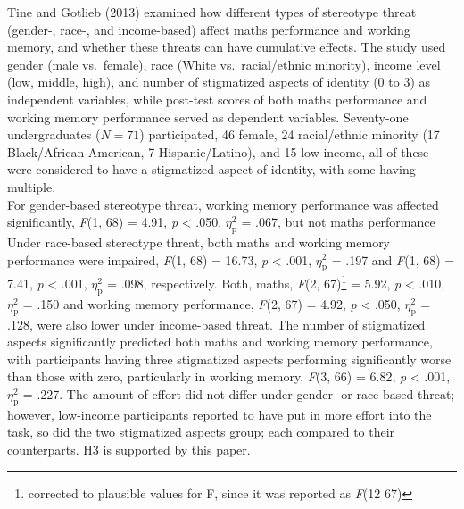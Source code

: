 \documentclass[
  stu, a4paper, 12pt,mask,floatsintext]{apa7}
\begin{document}
Tine and Gotlieb (2013) examined how different types of stereotype threat (gender-, race-, and income-based) affect maths performance and working memory, and whether these threats can have cumulative effects.
The study used gender (male vs.~female), race (White vs.~racial/ethnic minority), income level (low, middle, high), and number of stigmatized aspects of identity (0 to 3) as independent variables, while post-test scores of both maths performance and working memory performance served as dependent variables.
Seventy-one undergraduates (\(N=71\)) participated, 46 female, 24 racial/ethnic minority (17 Black/African American, 7 Hispanic/Latino), and 15 low-income, all of these were considered to have a stigmatized aspect of identity, with some having multiple.\\
For gender-based stereotype threat, working memory performance was affected significantly, \emph{F}(1, 68) = 4.91, \emph{p} \textless{} .050, \(\eta^{2}_{\text{p}}\) = .067, but not maths performance
Under race-based stereotype threat, both maths and working memory performance were impaired, \emph{F}(1, 68) = 16.73, \emph{p} \textless{} .001, \(\eta^{2}_{\text{p}}\) = .197 and \emph{F}(1, 68) = 7.41, \emph{p} \textless{} .001, \(\eta^{2}_{\text{p}}\) = .098, respectively.
Both, maths, \emph{F}(2, 67)\footnote{corrected to plausible values for F, since it was reported as \emph{F}(12 67)} = 5.92, \emph{p} \textless{} .010, \(\eta^{2}_{\text{p}}\) = .150 and working memory performance, \emph{F}(2, 67) = 4.92, \emph{p} \textless{} .050, \(\eta^{2}_{\text{p}}\) = .128, were also lower under income-based threat.
The number of stigmatized aspects significantly predicted both maths and working memory performance, with participants having three stigmatized aspects performing significantly worse than those with zero, particularly in working memory, \emph{F}(3, 66) = 6.82, \emph{p} \textless{} .001, \(\eta^{2}_{\text{p}}\) = .227.
The amount of effort did not differ under gender- or race-based threat; however, low-income participants reported to have put in more effort into the task, so did the two stigmatized aspects group; each compared to their counterparts.
H3 is supported by this paper.
\end{document}

